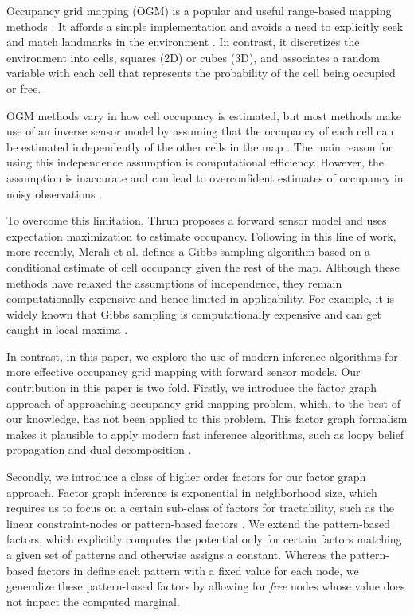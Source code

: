 \documentclass[letterpaper, 10 pt, conference]{ieeeconf} %
\begin{document}
Occupancy grid mapping (OGM) is a popular and useful range-based mapping methods 
\cite{elfes1989using,moravec1988sensor}.  It affords a simple implementation and 
avoids a need to explicitly seek and match landmarks in the environment 
\cite{sugihara1988some,betke1997landmarks}. In contrast, it discretizes the
environment into cells, squares (2D) or cubes (3D), and associates a random
variable with each cell that represents the probability of the cell being
occupied or free.  

OGM methods vary in how cell occupancy is estimated, but most methods make use 
of an inverse sensor model by assuming that the occupancy of each cell can be 
estimated independently of the other cells in the map \cite{elfes1989using,moravec1988sensor,moravec1985high,newcombe2011kinectfusion}.  The main 
reason for using this independence assumption is computational efficiency.  
However, the assumption is inaccurate and can lead to overconfident estimates of 
occupancy in noisy observations \cite{thrun2003learning,merali2013icra}. 

To overcome this limitation, Thrun \cite{thrun2003learning} proposes a forward 
sensor model and uses expectation maximization to estimate occupancy.  Following 
in this line of work, more recently, Merali et al. \cite{merali2013icra} defines 
a Gibbs sampling algorithm based on a conditional estimate of cell occupancy 
given the rest of the map.   Although these methods have relaxed the assumptions 
of independence, they remain computationally expensive and hence limited in 
applicability.  For example, it is widely known that Gibbs sampling is 
computationally expensive and can get caught in local maxima \cite{LiBOOK2002}.

In contrast, in this paper, we explore the use of modern inference algorithms 
for more effective occupancy grid mapping with forward sensor models.
Our contribution in this paper is two fold. Firstly, we introduce the factor
graph approach of approaching occupancy grid mapping problem, which, to the
best of our knowledge, has not been applied to this problem.   This factor graph 
formalism makes it plausible to apply modern fast inference algorithms, such as 
loopy belief propagation \cite{kschischang2001factor} and dual decomposition 
\cite{sontag2011introduction}.  

Secondly, we introduce a class of higher order factors for our factor graph 
approach.  Factor graph inference is exponential in neighborhood size, which 
requires us to focus on a certain sub-class of factors for tractability, such 
as the linear constraint-nodes \cite{potetz2007efficient} or pattern-based 
factors \cite{komodakis2009beyond}.  We extend the pattern-based factors, 
which explicitly computes the potential only for certain factors matching a 
given set of patterns and otherwise assigns a constant.  Whereas the 
pattern-based factors in \cite{komodakis2009beyond} define each pattern with 
a fixed value for each node, we generalize these pattern-based factors by 
allowing for \textit{free} nodes whose value does not impact the computed 
marginal.  
\end{document}
